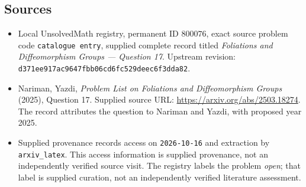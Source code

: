 \documentclass[11pt]{article}
\begin{document}
\subsection{Sources}
\begin{itemize}
\item Local UnsolvedMath registry, permanent ID \(800076\), exact source problem code \texttt{catalogue entry}, supplied complete record titled \emph{Foliations and Diffeomorphism Groups --- Question 17}. Upstream revision: \texttt{d371ee917ac9647fbb06cd6fc529deec6f3dda82}.
\item Nariman, Yazdi, \emph{Problem List on Foliations and Diffeomorphism Groups} (2025), Question 17. Supplied source URL: \url{https://arxiv.org/abs/2503.18274}. The record attributes the question to Nariman and Yazdi, with proposed year 2025.
\item Supplied provenance records access on \texttt{2026-10-16} and extraction by \texttt{arxiv\_latex}. This access information is supplied provenance, not an independently verified source visit. The registry labels the problem \emph{open}; that label is supplied curation, not an independently verified literature assessment.
\end{itemize}
\end{document}
